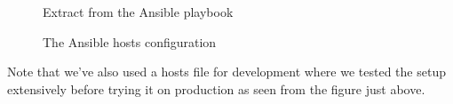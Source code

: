 \begin{figure}[H]
    \centering
    \caption{Extract from the Ansible playbook}
    \label{fig:extract-from-ansible-playbook}
\end{figure}

\begin{figure}[H]
    \centering
    \caption{The Ansible hosts configuration}
    \label{fig:image-of-ansible-hosts}
\end{figure}
Note that we've also used a hosts file for development where we tested the setup extensively before trying it on production as seen from the figure just above.

